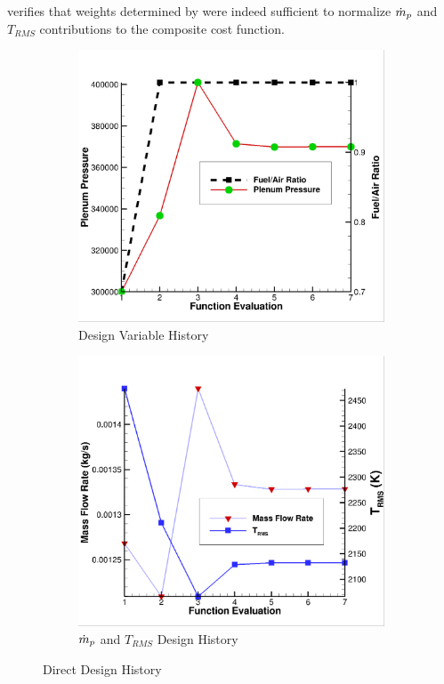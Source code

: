  verifies that weights determined by
 were indeed sufficient to normalize $\dot{m}_p$ and
$T_{RMS}$ contributions to the composite cost function.
\begin{figure}[h]
  \centering
	\begin{subfigure}[b]{0.4\textwidth}
    \centering
    \includegraphics[width=\textwidth]{figures/direct_design/dv-hist.png}
    \caption{Design Variable History}
    \label{fig:dd-dv-hist}
  \end{subfigure}
	\begin{subfigure}[b]{0.4\textwidth}
    \centering
    \includegraphics[width=\textwidth]{figures/direct_design/mass-tt.png}
    \caption{$\dot{m}_p$ and $T_{RMS}$ Design History}
    \label{fig:dd-mass-tt}
  \end{subfigure}
  \caption{Direct Design History}
  \label{fig:dd-history}
\end{figure}
